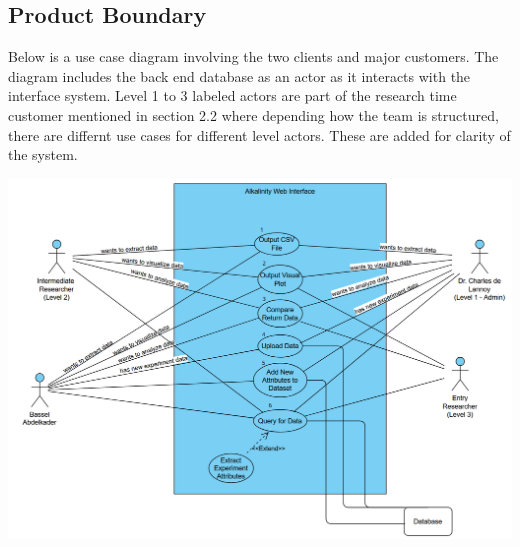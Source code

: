 \documentclass[12pt]{article}
\begin{document}
\subsection{Product Boundary}
Below is a use case diagram involving the two clients and major customers. The
diagram includes the back end database as an actor as it interacts with the
interface system. Level 1 to 3 labeled actors are part of the research time
customer mentioned in section 2.2 where depending how the team is structured,
there are differnt use cases for different level actors. These are added for
clarity of the system.
\begin{center}
  \includegraphics[scale=0.5]{capstoneUseCase.png}
\end{center}
\end{document}
